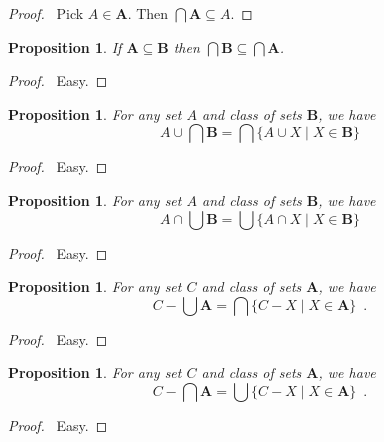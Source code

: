 \documentclass{article}
\let\qed\relax
\newtheorem{proposition}[axiom]{Proposition}
\theoremstyle{definition}
\begin{document}
    \begin{proof}
        \pf\ Pick $A \in \mathbf{A}$. Then $\bigcap \mathbf{A} \subseteq A$. \qed
    \end{proof}
    
    \begin{proposition}
        If $\mathbf{A} \subseteq \mathbf{B}$ then $\bigcap \mathbf{B} \subseteq \bigcap \mathbf{A}$.
    \end{proposition}

    \begin{proof}
        \pf\ Easy. \qed
    \end{proof}

    \begin{proposition}
        For any set $A$ and class of sets $\mathbf{B}$, we have
        \[ A \cup \bigcap \mathbf{B} = \bigcap \{ A \cup X \mid X \in \mathbf{B} \} \]
    \end{proposition}

    \begin{proof}
        \pf\ Easy. \qed
    \end{proof}

    \begin{proposition}
        For any set $A$ and class of sets $\mathbf{B}$, we have
        \[ A \cap \bigcup \mathbf{B} = \bigcup \{ A \cap X \mid X \in \mathbf{B} \} \]
    \end{proposition}

    \begin{proof}
        \pf\ Easy. \qed
    \end{proof}

    \begin{proposition}
        For any set $C$ and class of sets $\mathbf{A}$, we have
        \[ C - \bigcup \mathbf{A} = \bigcap \{ C - X \mid X \in \mathbf{A} \} \enspace . \]
    \end{proposition}

    \begin{proof}
        \pf\ Easy. \qed
    \end{proof}

    \begin{proposition}
        For any set $C$ and class of sets $\mathbf{A}$, we have
        \[ C - \bigcap \mathbf{A} = \bigcup \{ C - X \mid X \in \mathbf{A} \} \enspace . \]
    \end{proposition}

    \begin{proof}
        \pf\ Easy. \qed
    \end{proof}
\end{document}
